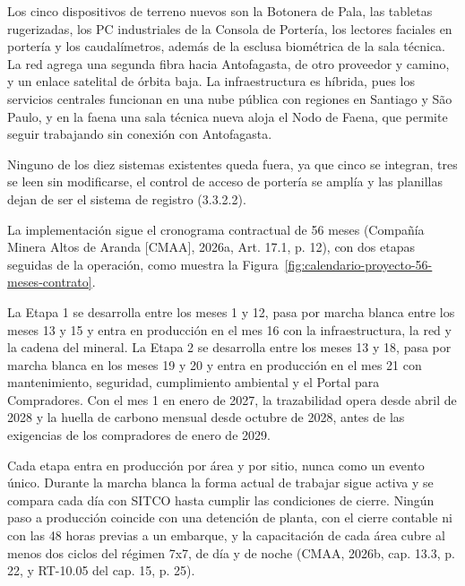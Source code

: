 \documentclass[subdoc]{../../comun/overfore}
\begin{document}
Los cinco dispositivos de terreno nuevos son la Botonera de Pala, las tabletas rugerizadas, los PC industriales de la Consola de Portería, los lectores faciales en portería y los caudalímetros, además de la esclusa biométrica de la sala técnica. La red agrega una segunda fibra hacia Antofagasta, de otro proveedor y camino, y un enlace satelital de órbita baja. La infraestructura es híbrida, pues los servicios centrales funcionan en una nube pública con regiones en Santiago y São Paulo, y en la faena una sala técnica nueva aloja el Nodo de Faena, que permite seguir trabajando sin conexión con Antofagasta.

Ninguno de los diez sistemas existentes queda fuera, ya que cinco se integran, tres se leen sin modificarse, el control de acceso de portería se amplía y las planillas dejan de ser el sistema de registro (3.3.2.2).

La implementación sigue el cronograma contractual de 56 meses (Compañía Minera Altos de Aranda [CMAA], 2026a, Art. 17.1, p. 12), con dos etapas seguidas de la operación, como muestra la Figura~\ref{fig:calendario-proyecto-56-meses-contrato}.

La Etapa 1 se desarrolla entre los meses 1 y 12, pasa por marcha blanca entre los meses 13 y 15 y entra en producción en el mes 16 con la infraestructura, la red y la cadena del mineral. La Etapa 2 se desarrolla entre los meses 13 y 18, pasa por marcha blanca en los meses 19 y 20 y entra en producción en el mes 21 con mantenimiento, seguridad, cumplimiento ambiental y el Portal para Compradores. Con el mes 1 en enero de 2027, la trazabilidad opera desde abril de 2028 y la huella de carbono mensual desde octubre de 2028, antes de las exigencias de los compradores de enero de 2029.

Cada etapa entra en producción por área y por sitio, nunca como un evento único. Durante la marcha blanca la forma actual de trabajar sigue activa y se compara cada día con SITCO hasta cumplir las condiciones de cierre. Ningún paso a producción coincide con una detención de planta, con el cierre contable ni con las 48 horas previas a un embarque, y la capacitación de cada área cubre al menos dos ciclos del régimen 7x7, de día y de noche (CMAA, 2026b, cap. 13.3, p. 22, y RT-10.05 del cap. 15, p. 25).
\end{document}
